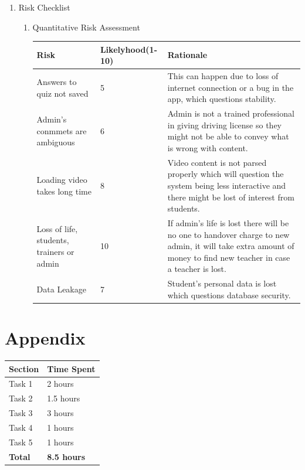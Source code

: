 \documentclass{article}
\begin{document}
\begin{enumerate}
    \item Risk Checklist
    \begin{enumerate}
        \item Quantitative Risk Assessment \\
        \begin{tabular}{|p{4.5cm}|p{4.5cm}|p{4.5cm}|} \hline
        Risk&Likelyhood(1-10)&Rationale\\ \hline
        Answers to quiz not saved&5&This can happen due to loss of internet connection or a bug in the app, which questions stability.\\ \hline
        Admin's conmmets are ambiguous&6&Admin is not a trained professional in giving driving license so they might not be able to convey what is wrong with content.\\ \hline
        Loading video takes long time&8&Video content is not parsed properly which will question the system being less interactive and there might be lost of interest from students.\\ \hline
        Loss of life, students, trainers or admin&10&If admin's life is lost there will be no one to handover charge to new admin, it will take extra amount of money to find new teacher in case a teacher is lost.\\ \hline
        Data Leakage&7&Student's personal data is lost which questions database security.\\ \hline
        \end{tabular}
    \end{enumerate}
\end{enumerate}

\section{Appendix}
\begin{tabular}{|p{5.5cm}|p{6.5cm}|}
\hline
\textbf{Section} & \textbf{Time Spent} \\ \hline
Task 1 & 2 hours \\ \hline
Task 2 & 1.5 hours \\ \hline
Task 3 & 3 hours \\ \hline
Task 4 & 1 hours \\ \hline
Task 5 & 1 hours \\ \hline
\textbf{Total} & \textbf{8.5 hours} \\ \hline
\end{tabular}
\end{document}
